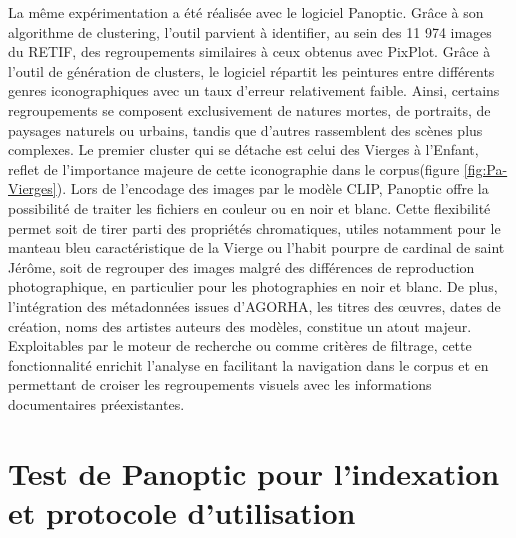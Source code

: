 La même expérimentation a été réalisée avec le logiciel Panoptic. Grâce à son algorithme de clustering, l’outil parvient à identifier, au sein des 11 974 images du RETIF, des regroupements similaires à ceux obtenus avec PixPlot. Grâce à l’outil de génération de clusters, le logiciel répartit les peintures entre différents genres iconographiques avec un taux d’erreur relativement faible. Ainsi, certains regroupements se composent exclusivement de natures mortes, de portraits, de paysages naturels ou urbains, tandis que d’autres rassemblent des scènes plus complexes. Le premier cluster qui se détache est celui des Vierges à l’Enfant, reflet de l’importance majeure de cette iconographie dans le corpus(figure \ref{fig:Pa-Vierges}). Lors de l’encodage des images par le modèle CLIP, Panoptic offre la possibilité de traiter les fichiers en couleur ou en noir et blanc. Cette flexibilité permet soit de tirer parti des propriétés chromatiques, utiles notamment pour le manteau bleu caractéristique de la Vierge ou l’habit pourpre de cardinal de saint Jérôme, soit de regrouper des images malgré des différences de reproduction photographique, en particulier pour les photographies en noir et blanc. De plus, l’intégration des métadonnées issues d’AGORHA, les titres des œuvres, dates de création, noms des artistes auteurs des modèles, constitue un atout majeur. Exploitables par le moteur de recherche ou comme critères de filtrage, cette fonctionnalité enrichit l’analyse en facilitant la navigation dans le corpus et en permettant de croiser les regroupements visuels avec les informations documentaires préexistantes.

\section[Indexation avec Panoptic]{Test de Panoptic pour l’indexation et protocole d’utilisation}
 
